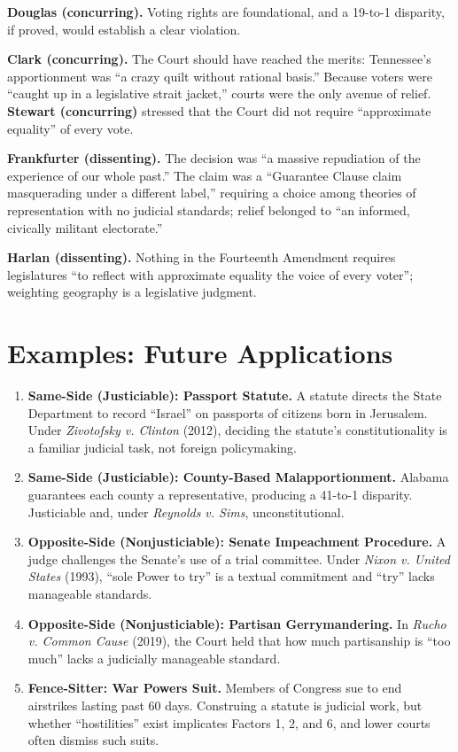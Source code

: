 \documentclass[12pt]{article}
\begin{document}
\textbf{Douglas (concurring).} Voting rights are foundational, and a 19-to-1 disparity, if proved, would establish a clear violation.

\textbf{Clark (concurring).} The Court should have reached the merits: Tennessee's apportionment was ``a crazy quilt without rational basis.'' Because voters were ``caught up in a legislative strait jacket,'' courts were the only avenue of relief. \textbf{Stewart (concurring)} stressed that the Court did not require ``approximate equality'' of every vote.

\textbf{Frankfurter (dissenting).} The decision was ``a massive repudiation of the experience of our whole past.'' The claim was a ``Guarantee Clause claim masquerading under a different label,'' requiring a choice among theories of representation with no judicial standards; relief belonged to ``an informed, civically militant electorate.''

\textbf{Harlan (dissenting).} Nothing in the Fourteenth Amendment requires legislatures ``to reflect with approximate equality the voice of every voter''; weighting geography is a legislative judgment.

\section{Examples: Future Applications}

\begin{enumerate}
\item \textbf{Same-Side (Justiciable): Passport Statute.} A statute directs the State Department to record ``Israel'' on passports of citizens born in Jerusalem. Under \textit{Zivotofsky v. Clinton} (2012), deciding the statute's constitutionality is a familiar judicial task, not foreign policymaking.
\item \textbf{Same-Side (Justiciable): County-Based Malapportionment.} Alabama guarantees each county a representative, producing a 41-to-1 disparity. Justiciable and, under \textit{Reynolds v. Sims}, unconstitutional.
\item \textbf{Opposite-Side (Nonjusticiable): Senate Impeachment Procedure.} A judge challenges the Senate's use of a trial committee. Under \textit{Nixon v. United States} (1993), ``sole Power to try'' is a textual commitment and ``try'' lacks manageable standards.
\item \textbf{Opposite-Side (Nonjusticiable): Partisan Gerrymandering.} In \textit{Rucho v. Common Cause} (2019), the Court held that how much partisanship is ``too much'' lacks a judicially manageable standard.
\item \textbf{Fence-Sitter: War Powers Suit.} Members of Congress sue to end airstrikes lasting past 60 days. Construing a statute is judicial work, but whether ``hostilities'' exist implicates Factors 1, 2, and 6, and lower courts often dismiss such suits.
\end{enumerate}
\end{document}
